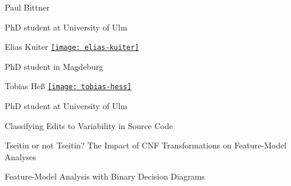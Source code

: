\documentclass[
	aspectratio=169, %
	8pt, %
]{beamer}
\begin{document}
\begin{frame}{\insertsection}
	\vspace{-5mm}
	\begin{fancycolumns}[t,columns=3,animation=none]
		\begin{note}{Paul Bittner}
			\centering
			\href{https://www.uni-ulm.de/in/sp/team/paul-maximilian-bittner/}{}

			\small PhD student at University of Ulm
		\end{note}
	\nextcolumn
		\begin{note}{Elias Kuiter}
			\centering
			\href{https://www.dbse.ovgu.de/en/Staff/Elias+Kuiter.html}{\texttt{[image: elias-kuiter]}}

			\small PhD student in Magdeburg
		\end{note}
	\nextcolumn
		\begin{note}{Tobias Heß}
			\centering
			\href{https://www.uni-ulm.de/in/sp/team/tobias-hess/}{\texttt{[image: tobias-hess]}}

			\small PhD student at University of Ulm
		\end{note}
	\end{fancycolumns}
	\begin{fancycolumns}[t,columns=3,animation=none]
		\small
		\begin{example}{}
			Classifying Edits to Variability in Source Code
		\end{example}
	\nextcolumn
		\small
		\begin{example}{}
			Tseitin or not Tseitin? The Impact of CNF Transformations on Feature-Model Analyses
		\end{example}
	\nextcolumn
		\small
		\begin{example}{}
			Feature-Model Analysis with Binary Decision Diagrams
		\end{example}
\end{fancycolumns}
\end{frame}


\end{document}
